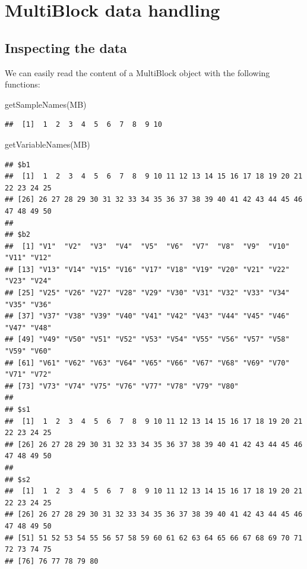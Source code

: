 \documentclass[
]{book}
\newenvironment{Shaded}{\begin{snugshade}}{\end{snugshade}}
\newcommand{\FunctionTok}[1]{\textcolor[rgb]{0.00,0.00,0.00}{#1}}
\newcommand{\NormalTok}[1]{#1}
\begin{document}
\hypertarget{handling}{%
\chapter{MultiBlock data handling}\label{handling}}

\hypertarget{inspecting-the-data}{%
\section{Inspecting the data}\label{inspecting-the-data}}

We can easily read the content of a MultiBlock object with the following
functions:

\begin{Shaded}
\begin{Highlighting}[]
\FunctionTok{getSampleNames}\NormalTok{(MB)}
\end{Highlighting}
\end{Shaded}

\begin{verbatim}
##  [1]  1  2  3  4  5  6  7  8  9 10
\end{verbatim}

\begin{Shaded}
\begin{Highlighting}[]
\FunctionTok{getVariableNames}\NormalTok{(MB)}
\end{Highlighting}
\end{Shaded}

\begin{verbatim}
## $b1
##  [1]  1  2  3  4  5  6  7  8  9 10 11 12 13 14 15 16 17 18 19 20 21 22 23 24 25
## [26] 26 27 28 29 30 31 32 33 34 35 36 37 38 39 40 41 42 43 44 45 46 47 48 49 50
## 
## $b2
##  [1] "V1"  "V2"  "V3"  "V4"  "V5"  "V6"  "V7"  "V8"  "V9"  "V10" "V11" "V12"
## [13] "V13" "V14" "V15" "V16" "V17" "V18" "V19" "V20" "V21" "V22" "V23" "V24"
## [25] "V25" "V26" "V27" "V28" "V29" "V30" "V31" "V32" "V33" "V34" "V35" "V36"
## [37] "V37" "V38" "V39" "V40" "V41" "V42" "V43" "V44" "V45" "V46" "V47" "V48"
## [49] "V49" "V50" "V51" "V52" "V53" "V54" "V55" "V56" "V57" "V58" "V59" "V60"
## [61] "V61" "V62" "V63" "V64" "V65" "V66" "V67" "V68" "V69" "V70" "V71" "V72"
## [73] "V73" "V74" "V75" "V76" "V77" "V78" "V79" "V80"
## 
## $s1
##  [1]  1  2  3  4  5  6  7  8  9 10 11 12 13 14 15 16 17 18 19 20 21 22 23 24 25
## [26] 26 27 28 29 30 31 32 33 34 35 36 37 38 39 40 41 42 43 44 45 46 47 48 49 50
## 
## $s2
##  [1]  1  2  3  4  5  6  7  8  9 10 11 12 13 14 15 16 17 18 19 20 21 22 23 24 25
## [26] 26 27 28 29 30 31 32 33 34 35 36 37 38 39 40 41 42 43 44 45 46 47 48 49 50
## [51] 51 52 53 54 55 56 57 58 59 60 61 62 63 64 65 66 67 68 69 70 71 72 73 74 75
## [76] 76 77 78 79 80
\end{verbatim}
\end{document}
